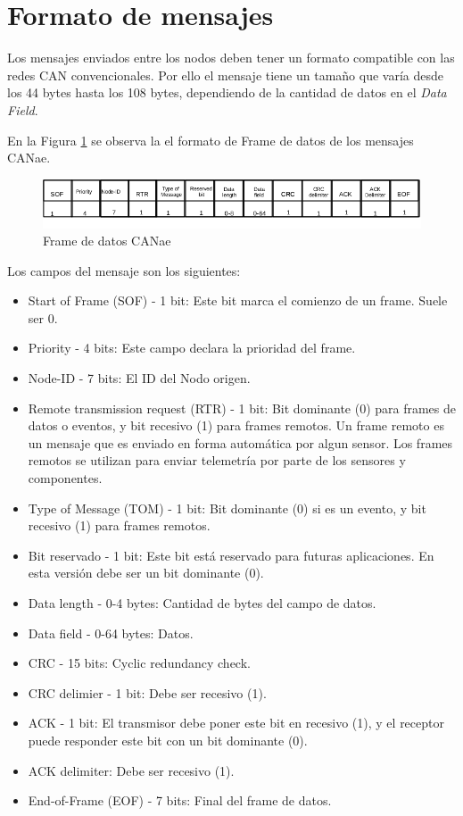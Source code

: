 \section{Formato de mensajes}
Los mensajes enviados entre los nodos deben tener un formato compatible con las
redes CAN convencionales. Por ello el mensaje tiene un tamaño que varía desde
los 44 bytes hasta los 108 bytes, dependiendo de la cantidad de datos en el
\textit{Data Field}.

En la Figura \ref{fig:Data_Frame} se observa la el formato de Frame de datos de
los mensajes CANae.

\begin{figure}[h!]
 \centering
 \includegraphics[scale=0.6]{images/Secciones/AppendixA/Data_Frame.jpg}
  \caption{Frame de datos CANae}
\label{fig:Data_Frame}
\end{figure}

Los campos del mensaje son los siguientes:

\begin{itemize}
\item Start of Frame (SOF) - 1 bit: Este bit marca el comienzo de un frame.
  Suele ser 0.
\item Priority - 4 bits: Este campo declara la prioridad del frame. 
\item Node-ID - 7 bits: El ID del Nodo origen.
\item Remote transmission request (RTR) - 1 bit: Bit dominante (0) para frames
  de datos o eventos, y bit recesivo (1) para frames remotos. Un frame remoto
  es un mensaje que es enviado en forma automática por algun sensor. Los frames
  remotos se utilizan para enviar telemetría por parte de los sensores y
  componentes.
\item Type of Message (TOM) - 1 bit: Bit dominante (0) si es un evento, y bit
  recesivo (1) para frames remotos.
\item Bit reservado - 1 bit: Este bit está reservado para futuras aplicaciones.
  En esta versión debe ser un bit dominante (0).
\item Data length - 0-4 bytes: Cantidad de bytes del campo de datos.
\item Data field - 0-64 bytes: Datos.
\item CRC - 15 bits: Cyclic redundancy check.
\item CRC delimier - 1 bit: Debe ser recesivo (1).
\item ACK - 1 bit: El transmisor debe poner este bit en recesivo (1), y el
  receptor puede responder este bit con un bit dominante (0).
\item ACK delimiter: Debe ser recesivo (1).
\item End-of-Frame (EOF) - 7 bits: Final del frame de datos.
\end{itemize}

